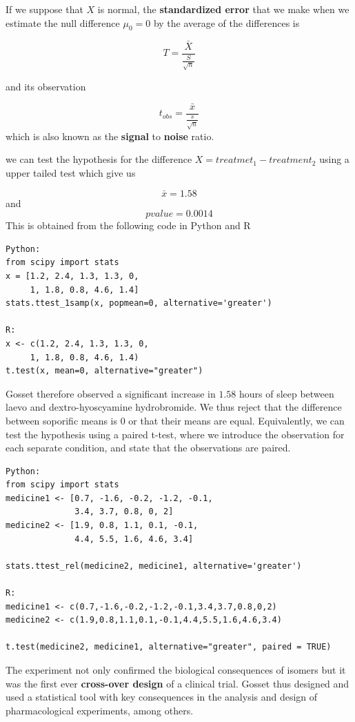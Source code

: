 \documentclass[
]{book}
\begin{document}
If we suppose that \(X\) is normal, the \textbf{standardized error} that we make when we estimate the null difference \(\mu_0=0\) by the average of the differences is

\[T=\frac{\bar{X}}{\frac{S}{\sqrt{n}}}\]

and its observation

\[t_{obs}=\frac{\bar{x}}{\frac{s}{\sqrt{n}}}\]
which is also known as the \textbf{signal} to \textbf{noise} ratio.

we can test the hypothesis for the difference \(X=treatmet_1-treatment_2\) using a upper tailed test which give us

\[\bar{x}=1.58\] and \[pvalue=0.0014\]
This is obtained from the following code in Python and R

\begin{verbatim}
Python:
from scipy import stats
x = [1.2, 2.4, 1.3, 1.3, 0, 
     1, 1.8, 0.8, 4.6, 1.4]
stats.ttest_1samp(x, popmean=0, alternative='greater')

R:
x <- c(1.2, 2.4, 1.3, 1.3, 0, 
     1, 1.8, 0.8, 4.6, 1.4)
t.test(x, mean=0, alternative="greater") 
\end{verbatim}

Gosset therefore observed a significant increase in \(1.58\) hours of sleep between laevo and dextro-hyoscyamine hydrobromide. We thus reject that the difference between soporific means is \(0\) or that their means are equal. Equivalently, we can test the hypothesis using a paired t-test, where we introduce the observation for each separate condition, and state that the observations are paired.

\begin{verbatim}
Python:
from scipy import stats
medicine1 <- [0.7, -1.6, -0.2, -1.2, -0.1,
              3.4, 3.7, 0.8, 0, 2]
medicine2 <- [1.9, 0.8, 1.1, 0.1, -0.1, 
              4.4, 5.5, 1.6, 4.6, 3.4]

stats.ttest_rel(medicine2, medicine1, alternative='greater')

R:
medicine1 <- c(0.7,-1.6,-0.2,-1.2,-0.1,3.4,3.7,0.8,0,2)
medicine2 <- c(1.9,0.8,1.1,0.1,-0.1,4.4,5.5,1.6,4.6,3.4)

t.test(medicine2, medicine1, alternative="greater", paired = TRUE) 
\end{verbatim}

The experiment not only confirmed the biological consequences of isomers but it was the first ever \textbf{cross-over design} of a clinical trial. Gosset thus designed and used a statistical tool with key consequences in the analysis and design of pharmacological experiments, among others.
\end{document}
